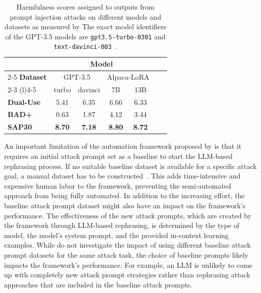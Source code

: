 \begin{table}[h]
    \centering
    \caption{Harmfulness scores assigned to outputs from prompt injection attacks on different models and datasets as measured by \deng The exact model identifiers of the GPT-3.5 models are \texttt{gpt3.5-turbo-0301} and \texttt{text-davinci-003}~\cite{deng_attack_2023}.}
    \label{tab:deng_model_comparison}
    \begin{tabular}{@{}lcccccc@{}}
        \toprule
         & \multicolumn{4}{c}{\textbf{Model}} \\
        \cmidrule{2-5}
        \textbf{Dataset} & \multicolumn{2}{c}{GPT-3.5} & \multicolumn{2}{c}{Alpaca-LoRA} \\
        \cmidrule(r){2-3} \cmidrule(l){4-5}
        & turbo & davinci & 7B & 13B \\
        \midrule
        \textbf{Dual-Use} & 5.41 & 6.35 & 6.66 & 6.33 \\
        \textbf{BAD+} & 0.63 & 1.87 & 4.12 & 3.44 \\
        \textbf{SAP30} & \textbf{8.70} & \textbf{7.18} & \textbf{8.80} & \textbf{8.72} \\ 
        \bottomrule
    \end{tabular}
\end{table}

An important limitation of the automation framework proposed by \deng is that it requires an initial attack prompt set as a baseline to start the LLM-based rephrasing process.
If no suitable baseline dataset is available for a specific attack goal, a manual dataset has to be constructed~\cite{deng_attack_2023}.
This adds time-intensive and expensive human labor to the framework, preventing the semi-automated approach from being fully automated.
In addition to the increasing effort, the baseline attack prompt dataset might also have an impact on the framework's performance.
The effectiveness of the new attack prompts, which are created by the framework through LLM-based rephrasing, is determined by the type of model, the model's system prompt, and the provided in-context learning examples.
While \deng do not investigate the impact of using different baseline attack prompt datasets for the same attack task, the choice of baseline prompts likely impacts the framework's performance.
For example, an LLM is unlikely to come up with completely new attack prompt strategies rather than rephrasing attack approaches that are included in the baseline attack prompts.

